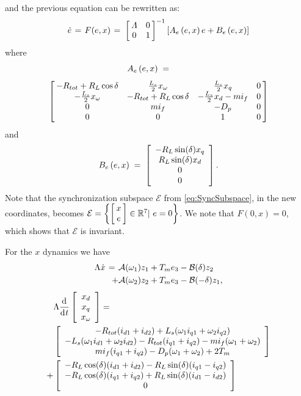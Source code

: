 \documentclass[letterpaper, 10 pt, conference]{ieeeconf}
\newcommand{\rline}  {{\mathbb R}}
\renewcommand{\o}    {{\omega}}
\newcommand{\m}      {{\hbox{\hskip 1pt}}}
\newcommand{\nm}     {{\hbox{\hskip -3pt}}}
\newcommand{\dd}     {{\rm d\hbox{\hskip 0.5pt}}}
\newcommand{\Amscr}  {{\mathcal{A}}}
\newcommand{\Bmscr}  {{\mathcal{B}}}
\newcommand{\Emscr}  {{\mathcal{E}}}
\begin{document}
and the previous equation can be rewritten as:
$$ \dot{e} \m=\m F(e,x) \m=\m \left[\nm\begin{array}{cc} \varLambda 
   & 0\\ 0 & 1 \end{array}\nm\right]^{-1} \left[A_e\left(e,x\right) 
   e + B_e \left(e,x\right) \right]$$
where 
$$ A_e\left(e,x\right) \m=\qquad\m$$
$$ \left[\nm\begin{array}{cccc}
   -R_{tot}+R_L\cos\delta & \frac{L_s}{2} x_{\o} & \frac{L_s}{2}
   x_q & 0\\ -\frac{L_s}{2} x_{\o} & -R_{tot} + R_L\cos\delta & 
   -\frac{L_s}{2} x_d - mi_f & 0\\ 0 & mi_f & -D_p & 0\\
   0 & 0 & 1 & 0 \end{array} \nm\right]$$ 
and
$$ B_e\left(e,x\right) \m=\m \left[\begin{array}{c} -R_L\sin(\delta)
   x_q\\ R_L\sin(\delta) x_d\\ 0\\ 0 \end{array}\right].$$
Note that the synchronization subspace $\Emscr$ from 
\eqref{eq:SyncSubspace}, in the new coordinates, becomes
$\Emscr=\left\{\left[\nm\begin{array}{c}x\\ e\end{array}\nm\right] 
\in\rline^7|\ e=0 \right\}$. We note that $F(0,x)=0$, which shows 
that $\Emscr$ is invariant.

For the $x$ dynamics we have
$$ \begin{aligned} \Lambda\dot{x} \m=\m & \Amscr(\o_1) z_1 + T_m e_3
   -\Bmscr(\delta) z_2\\ +& \Amscr(\o_2) z_2 + T_m e_3-\Bmscr
   (-\delta) z_1, \end{aligned}$$
\vspace{-2mm}
$$ \begin{aligned} &\Lambda\frac{\dd}{\dd t}\left[\begin{array}{c}
   x_{d}\\ x_{q}\\ x_{\o} \end{array}\right] = \\
   & \left[\begin{array}{c} - R_{tot}(i_{d1}+i_{d2})+L_s(\o_1 i_{q1}
   +\o_2 i_{q2})\\ -L_s(\o_1 i_{d1}+\o_2 i_{d2})-R_{tot}(i_{q1} +
   i_{q2})-m i_f(\o_1+\o_2)\\ m i_f(i_{q1}+i_{q2})-D_p(\o_1+\o_2) +
   2T_m \end{array}\right]\\ +& \left[ \begin{array}{c}
   -R_L\cos(\delta)(i_{d1}+i_{d2})-R_L\sin(\delta)(i_{q1}-i_{q2})\\
   -R_L\cos(\delta)(i_{q1}+i_{q2})+R_L\sin(\delta)(i_{d1}-i_{d2})\\
   0 \end{array}\right] \end{aligned}$$
\end{document}
